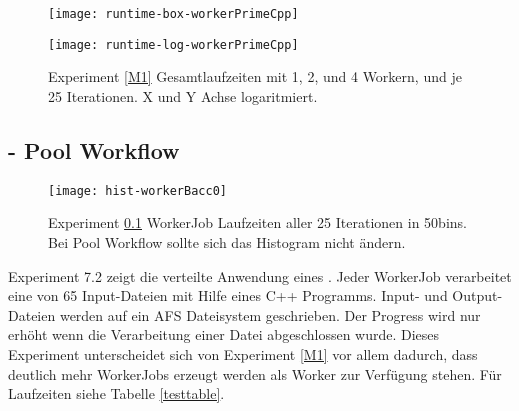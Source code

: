 \vspace*{\fill}

\begin{figure}[H]
  \centering
  \begin{minipage}[b]{0.45\textwidth}
    \texttt{[image: runtime-box-workerPrimeCpp]}
    \caption{Experiment \ref{M1}. Boxplots für Gesamtlaufzeit mit 1, 2, und 4 Worker, und je 25 Iterationen}
    \label{runtime-box-workerPrimeCpp}
  \end{minipage}
  \hfill
  \begin{minipage}[b]{0.45\textwidth}
    \texttt{[image: runtime-log-workerPrimeCpp]}
    \caption{Experiment \ref{M1} Gesamtlaufzeiten mit 1, 2, und 4 Workern, und je 25 Iterationen. X und Y Achse logaritmiert.}
    \label{runtime-log-workerPrimeCpp}
  \end{minipage}
\end{figure}
























\clearpage
\subsection{\rgAlgorithmus{} - Pool Workflow}
\label{M2}

\begin{wrapfigure}{r}{0.45\textwidth}
  \vspace{-30pt}
  \begin{center}
    \texttt{[image: hist-workerBacc0]}
    \caption{Experiment \ref{M2} WorkerJob Laufzeiten aller 25 Iterationen in 50bins. Bei Pool Workflow sollte sich das Histogram nicht ändern.}
    \label{hist-workerBacc0}
  \end{center}
\end{wrapfigure}

Experiment 7.2 zeigt die verteilte Anwendung eines \rgAlgorithmus{}.
Jeder WorkerJob verarbeitet eine von 65 Input-Dateien mit Hilfe eines C++ Programms.
Input- und Output-Dateien werden auf ein AFS Dateisystem geschrieben.
Der Progress wird nur erhöht wenn die Verarbeitung einer Datei abgeschlossen wurde.
Dieses Experiment unterscheidet sich von Experiment \ref{M1} vor allem dadurch, dass deutlich mehr WorkerJobs erzeugt werden als Worker zur Verfügung stehen.
Für Laufzeiten siehe Tabelle \ref{testtable}.

